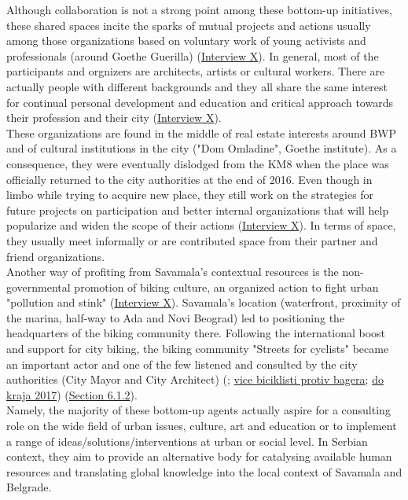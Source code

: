 \documentclass[11pt]{report}
\begin{document}
Although collaboration is not a strong point among these bottom-up initiatives, these shared spaces incite the sparks of mutual projects and actions usually among those organizations based on voluntary work of young activists and professionals (around Goethe Guerilla) (\href{InterviewX}{Interview X}).
In general, most of the participants and orgnizers are architects, artists or cultural workers.
There are actually people with different backgrounds and they all share the same interest for continual personal development and education and critical approach towards their profession and their city (\href{InterviewX}{Interview X}).
\\

These organizations are found in the middle of real estate interests around BWP and  of cultural institutions in the city ("Dom Omladine", Goethe institute).
As a consequence, they were eventually dislodged from the KM8 when the place was officially returned to the city authorities at the end of 2016.
Even though in limbo while trying to acquire new place, they still work on the strategies for future projects on participation and better internal organizations that will help popularize and widen the scope of their actions (\href{InterviewX}{Interview X}).
In terms of space, they usually meet informally or are contributed space from their partner and friend organizations.
\\

Another way of profiting from Savamala's contextual resources is the non-governmental promotion of biking culture, an organized action to fight urban "pollution and stink"
(\href{InterviewX}{Interview X}).
Savamala's location (waterfront, proximity of the marina, half-way to Ada and Novi Beograd) led to positioning the headquarters of the biking community there. 
Following the international boost and support for city biking, the biking community "Streets for cyclists" became an important actor and one of the few listened and consulted by the city authorities (City Mayor and City Architect) (\href{Kontrapress protest zbog blokade}{\citealt{Kontrapress}}; \href{vice}{vice biciklisti protiv bagera}; \href{danubeograd}{do kraja 2017}) (\href{Section 6.1.2}{Section 6.1.2}).
\\

Namely, the majority of these bottom-up agents actually aspire for a consulting role on the wide field of urban issues, culture, art and education or to implement a range of ideas/solutions/interventions at urban or social level. In Serbian context, they aim to provide an alternative body for catalysing available human resources and translating global knowledge into the local context of Savamala and Belgrade.
\end{document}
